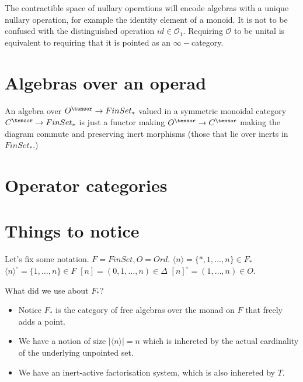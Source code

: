 The contractible space of nullary operations will encode algebras with a unique nullary operation, for example the identity element of a monoid. It is not to be confused with the distinguished operation $id\in \mathcal{O}_1$. Requiring $\mathcal{O}$ to be unital is equivalent to requiring that it is pointed as an $\infty-$category.

\section{Algebras over an operad}
An algebra over $O^\tensor\rightarrow FinSet_*$ valued in a symmetric monoidal category $C^\tensor\rightarrow FinSet_*$ is just a functor making $O^\tensor\rightarrow C^\tensor$ making the diagram commute and preserving inert morphisms (those that lie over inerts in $FinSet_*$.)

\section{Operator categories}

\section{Things to notice}
Let's fix some notation. $F=FinSet, O=Ord$.
$\langle n \rangle=\{*,1,\dots,n\} \in F_*$
$\langle n \rangle^\circ=\{1,\dots,n\}\in F$
$[n]=(0,1,\dots,n) \in \Delta$
$[n]^\circ=(1,\dots,n) \in O$.

What did we use about $F_*$?
\begin{itemize}
    \item Notice $F_*$ is the category of free algebras over the monad on $F$ that freely adds a point.
    \item We have a notion of size $|\langle n \rangle|=n$ which is inhereted by the actual cardinality of the underlying unpointed set.
    \item We have an inert-active factorisation system, which is also inhereted by $T.$
\end{itemize}

